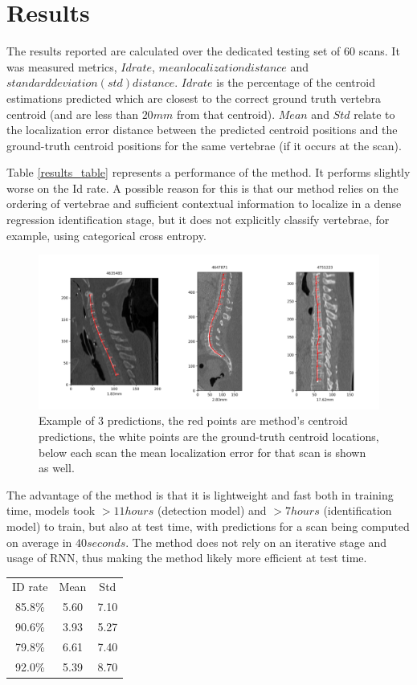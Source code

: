 \chapter{Results}
\label{ch:results}

The results reported are calculated over the dedicated testing set of $60$ scans. It was measured metrics, $Id rate$, $mean localization distance$ and $standard deviation (std) distance$. $Id rate$ is the percentage of the centroid estimations predicted which are closest to the correct ground truth vertebra centroid (and are less than $20mm$ from that centroid). $Mean$ and $Std$ relate to the localization error distance between the predicted centroid positions and the ground-truth centroid positions for the same vertebrae (if it occurs at the scan). 

Table \ref{results_table} represents a performance of the method.
It performs slightly worse on the Id rate. A possible reason for this is that our method relies on the ordering of vertebrae and sufficient contextual information to localize in a dense regression identification stage, but it does not explicitly classify vertebrae, for example, using categorical cross entropy. 

\begin{figure}[!h]
\begin{center}
\includegraphics[width=.5\linewidth]{images/3_predictions.png}
\caption {Example of 3 predictions, the red points are method’s centroid predictions, the white points are the ground-truth centroid locations, below each scan the mean localization error for that scan is shown as well.} 
\label{fig:3_predictions}
\end{center}
\end{figure}

The advantage of the method is that it is lightweight and fast both in training time, models took $> 11 hours$ (detection model) and $> 7 hours$ (identification model) to train, but also at test time, with predictions for a scan being computed on average in $40 seconds$. The method does not rely on an iterative stage and usage of RNN, thus making the method likely more efficient at test time.

\begin{center}\label{results_table}
\begin{tabular}{ c c c }
 ID rate & Mean & Std \\ 
 85.8\% & 5.60 & 7.10 \\  
 90.6\% & 3.93 & 5.27 \\
 79.8\% & 6.61 & 7.40 \\
 92.0\% & 5.39 & 8.70 \\
\end{tabular}
\end{center}


